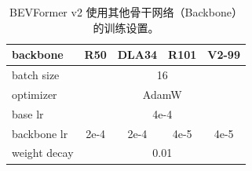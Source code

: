 \let\ck\checkmark

\setlength{\tabcolsep}{5pt}
\setlength{\doublerulesep}{2\arrayrulewidth}
\renewcommand{\arraystretch}{1.0}
\begin{table}[ht]
    \caption{BEVFormer v2 使用其他骨干网络（Backbone）的训练设置。}
    \label{table:training_setting_other}
    \centering
    \begin{tabular}{l|cccc}
        backbone & R50 & DLA34 & R101 & V2-99 \\
        \hline
        batch size & \multicolumn{4}{c}{16} \\
        optimizer & \multicolumn{4}{c}{AdamW} \\
        base lr & \multicolumn{4}{c}{4e-4} \\
        backbone lr & 2e-4 & 2e-4 & 4e-5 & 4e-5 \\
        weight decay & \multicolumn{4}{c}{0.01} \\
        \hline
    \end{tabular}
    
\end{table}